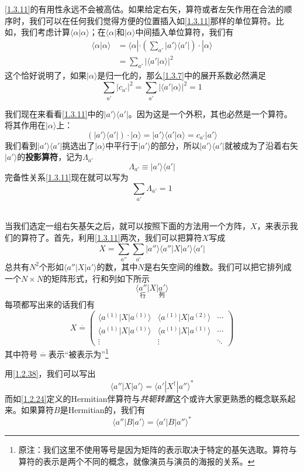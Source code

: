 \documentclass[UTF8,twoside]{ctexart}
\def\be{\begin{equation}}
\def\ee{\end{equation}}
\begin{document}
\eqref{1.3.11}的有用性永远不会被高估。如果给定右矢，算符或者左矢作用在合法的顺序时，我们可以在任何我们觉得方便的位置插入如\eqref{1.3.11}那样的单位算符。比如，我们考虑计算$\langle\alpha|\alpha\rangle$；在$\langle\alpha|$和$|\alpha\rangle$中间插入单位算符，我们有
\be
\begin{split}
\langle\alpha|\alpha\rangle&=\langle\alpha|\cdot\left(\sum_{a'}|a'\rangle\langle a'|\right)\cdot|\alpha\rangle\\
&=\sum_{a'}|\langle a'|\alpha\rangle|^2
\end{split}
\ee
这个恰好说明了，如果$|\alpha\rangle$是归一化的，那么\eqref{1.3.7}中的展开系数必然满足
\be
\sum_{a'}|c_{a'}|^2 = \sum_{a'}|\langle a'|\alpha\rangle|^2 = 1
\ee

我们现在来看看\eqref{1.3.11}中的$|a'\rangle\langle a'|$。因为这是一个外积，其也必然是一个算符。将其作用在$|\alpha\rangle$上：
\be
(|a'\rangle\langle a'|)\cdot|\alpha\rangle = |a'\rangle\langle a'|\alpha\rangle = c_{a'}|a'\rangle
\ee
我们看到$|a'\rangle\langle a'|$挑选出了$|\alpha\rangle$中平行于$|a'\rangle$的部分，所以$|a'\rangle\langle a'|$就被成为了沿着右矢$|a'\rangle$的{\bf 投影算符}，记为$\Lambda_{a'}$
\be
\Lambda_{a'}\equiv|a'\rangle\langle a'|
\ee
完备性关系\eqref{1.3.11}现在就可以写为
\be
\sum_{a'}\Lambda_{a'}=1
\ee
\ \\


\noindent 当我们选定一组右矢基矢之后，就可以按照下面的方法用一个方阵，$X$，来表示我们的算符了。首先，利用\eqref{1.3.11}两次，我们可以把算符$X$写成
\be
X = \sum_{a''}\sum_{a'}|a''\rangle\langle a''|X|a'\rangle\langle a'|
\ee
总共有$N^2$个形如$\langle a''|X|a'\rangle$的数，其中$N$是右矢空间的维数。我们可以把它排列成一个$N\times N$的矩阵形式，行和列如下所示
\be
\langle \underset{\text{行}}{a''}|X|\underset{\text{列}}{a'}\rangle
\ee
每项都写出来的话我们有
\be
X \overset{\cdot}{=}\left(\begin{matrix}
\langle a^{(1)}|X|a^{(1)}\rangle & \langle a^{(1)}|X|a^{(2)}\rangle & \cdots\\
\langle a^{(1)}|X|a^{(1)}\rangle & \langle a^{(1)}|X|a^{(1)}\rangle & \cdots\\
\vdots & \vdots & \ddots \end{matrix}\right)
\ee
其中符号$\overset{\cdot}{=}$表示``被表示为''\footnote{原注：我们这里不使用等号是因为矩阵的表示取决于特定的基矢选取。算符与算符的表示是两个不同的概念，就像演员与演员的海报的关系。}

用\eqref{1.2.38}，我们可以写出
\be
\langle a''|X|a'\rangle = \langle a'|X^\dagger|a''\rangle^*
\ee
而如\eqref{1.2.24}定义的Hermitian伴算符与{\it 共轭转置}这个或许大家更熟悉的概念联系起来。如果算符$B$是Hermitian的，我们有
\be
\langle a''|B|a'\rangle = \langle a'|B|a''\rangle^*
\ee
\end{document}
